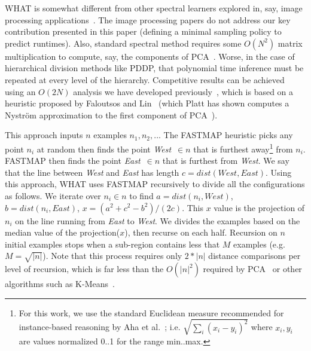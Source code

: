\documentclass{sig-alternative}
\begin{document}
WHAT is somewhat different from other spectral
learners explored in, say, image processing applications~\cite{shi00}.
The image processing papers do not address
our key contribution presented in this paper  (defining
 a minimal sampling policy to predict runtimes).
Also,
standard spectral method requires some $O(N^2)$ matrix multiplication to compute, say, the components
of PCA~\cite{ilin10}. Worse, in the case of hierarchical division methods like PDDP,
that polynomial time inference must be repeated at every level of the hierarchy.
Competitive results can be achieved
using an $O(2N)$ analysis we have developed previously~\cite{me12d}, which is  based on  a heuristic proposed by
Faloutsos and Lin~\cite{Faloutsos1995}
(which
Platt has
  shown computes a Nystr\"om
  approximation to the first component of
  PCA~\cite{platt05}).
  
  This approach inputs
$n$
examples $n_1,n_2,..$. The FASTMAP heuristic
picks any
point $n_i$ at random then  finds
 the point  {\em West}~$\in n$ that is
furthest away\footnote{
 For this work, we use the standard Euclidean measure recommended for
instance-based reasoning by Aha et al.~\cite{aha91};
i.e. $\sqrt{\sum_i(x_i-y_i)^2}$ where $x_i,y_i$
are values normalized 0..1 for the range min..max.}
from $n_i$.
FASTMAP then
finds the point {\em East}~$\in n$
that is furthest from {\em West}.
We say that the line between {\em West} and {\em East} has  length  
$c=\mathit{dist}(\mathit{West},\mathit{East})$.
Using this  approach, WHAT uses FASTMAP recursively to divide all the configurations as follows.
We iterate over $n_i \in n$
to find
$a=\mathit{dist}(n_i,\mathit{West})$,
$b=\mathit{dist}(n_i,\mathit{East})$,
$x=(a^2 + c^2 - b^2)/(2c)$.
This  $x$ value is the projection of $n_i$
on the line  running  from {\em East} to {\em West}.  We divides
the examples based on the median value of the projection($x$),
then recurse on each half. Recursion on
$n$ initial
examples stops when a sub-region
contains less that  $M$ examples (e.g. 
$M=\sqrt{|n|}$).
Note that this process requires only $2*|n|$ distance comparisons
per level of recursion, which is far less than the $O(|n|^2)$
required by PCA~\cite{Du2008}
or other  algorithms such as K-Means~\cite{hamerly2010making}.
\end{document}
